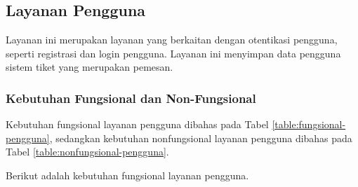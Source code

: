 \subsection{Layanan Pengguna}

Layanan ini merupakan layanan yang berkaitan dengan otentikasi pengguna, seperti registrasi dan login pengguna. Layanan ini menyimpan data pengguna sistem tiket yang merupakan pemesan.

\subsubsection{Kebutuhan Fungsional dan Non-Fungsional}

Kebutuhan fungsional layanan pengguna dibahas pada Tabel \ref{table:fungsional-pengguna}, sedangkan kebutuhan nonfungsional layanan pengguna dibahas pada Tabel \ref{table:nonfungsional-pengguna}.

\pagebreak

Berikut adalah kebutuhan fungsional layanan pengguna.

